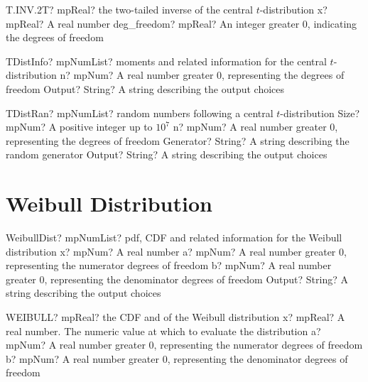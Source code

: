 \documentclass[12pt,a4paper,openany]{book}
\begin{document}
\begin{mpFunctionsExtract}
\mpWorksheetFunctionTwoNotImplemented
{T.INV.2T? mpReal? the two-tailed inverse of the central $t$-distribution}
{x? mpReal? A real number}
{deg\_freedom? mpReal? An integer  greater 0, indicating the degrees of freedom}
\end{mpFunctionsExtract}

\begin{mpFunctionsExtract}
\mpFunctionTwoNotImplemented
{TDistInfo? mpNumList? moments and related information for the central $t$-distribution}
{n? mpNum? A real number greater 0, representing the degrees of freedom}
{Output? String? A string describing the output choices}
\end{mpFunctionsExtract}

\begin{mpFunctionsExtract}
\mpFunctionFourNotImplemented
{TDistRan? mpNumList? random numbers following a central $t$-distribution}
{Size? mpNum? A positive integer up to $10^7$}
{n? mpNum? A real number greater 0, representing the degrees of freedom}
{Generator? String? A string describing the random generator}
{Output? String? A string describing the output choices}
\end{mpFunctionsExtract}

\section{Weibull Distribution}

\begin{mpFunctionsExtract}
\mpFunctionFourNotImplemented
{WeibullDist? mpNumList? pdf, CDF and related information for the Weibull distribution}
{x? mpNum? A real number}
{a? mpNum? A real number greater 0, representing the numerator  degrees of freedom}
{b? mpNum? A real number greater 0, representing the denominator degrees of freedom}
{Output? String? A string describing the output choices}
\end{mpFunctionsExtract}

\begin{mpFunctionsExtract}
\mpWorksheetFunctionThreeNotImplemented
{WEIBULL? mpReal? the CDF and of the Weibull distribution}
{x? mpReal? A real number. The numeric value at which to evaluate the distribution}
{a? mpNum? A real number greater 0, representing the numerator  degrees of freedom}
{b? mpNum? A real number greater 0, representing the denominator degrees of freedom}
\end{mpFunctionsExtract}
\end{document}
